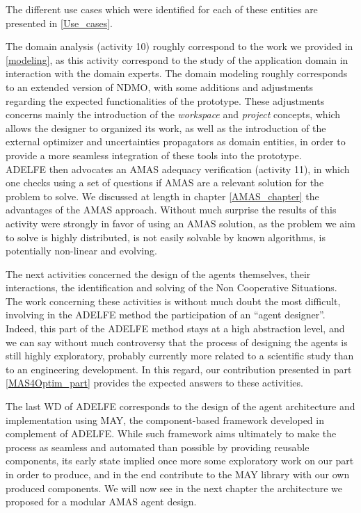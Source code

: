 The different use cases which were identified for each of these entities are presented in \figurename{} \ref{Use_cases}.

The domain analysis (activity 10) roughly correspond to the work we provided in \ref{modeling}, as this activity correspond to the study of the application domain in interaction with the domain experts. The domain modeling roughly corresponds to an extended version of NDMO, with some additions and adjustments regarding the expected functionalities of the prototype. These adjustments concerns mainly the introduction of the \emph{workspace} and \emph{project} concepts, which allows the designer to organized its work, as well as the introduction of the external optimizer and uncertainties propagators as domain entities, in order to provide a more seamless integration of these tools into the prototype.\\
ADELFE then advocates an AMAS adequacy verification (activity 11), in which one checks using a set of questions if AMAS are a relevant solution for the problem to solve. We discussed at length in chapter \ref{AMAS_chapter} the advantages of the AMAS approach. Without much surprise the results of this activity were strongly in favor of using an AMAS solution, as the problem we aim to solve is highly distributed, is not easily solvable by known algorithms, is potentially non-linear and evolving.

The next activities concerned the design of the agents themselves, their interactions, the identification and solving of the Non Cooperative Situations. The work concerning these activities is without much doubt the most difficult, involving in the ADELFE method the participation of an \enquote{agent designer}. Indeed, this part of the ADELFE method stays at a high abstraction level, and we can say without much controversy that the process of designing the agents is still highly exploratory, probably currently more related to a scientific study than to an engineering development. In this regard, our contribution presented in part \ref{MAS4Optim_part} provides the expected answers to these activities.

The last WD of ADELFE corresponds to the design of the agent architecture and implementation using MAY, the component-based framework developed in complement of ADELFE. While such framework aims ultimately to make the process as seamless and automated than possible by providing reusable components, its early state implied once more some exploratory work on our part in order to produce, and in the end contribute to the MAY library with our own produced components. We will now see in the next chapter the architecture we proposed for a modular AMAS agent design.

